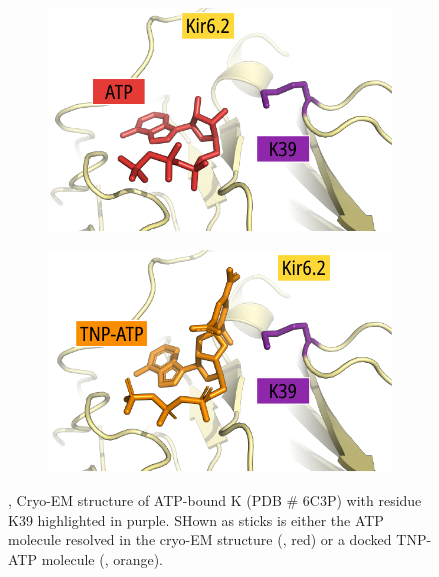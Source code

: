 \begin{figure}[h]
	\centering
	\begin{subfigure}[t]{0.45\textwidth}
		\caption{}\label{ch5fig:k39_clash_atp}
		\centering
		\includegraphics[width=\textwidth]{k39_clash_atp.pdf}
	\end{subfigure}
	\hfill
	\begin{subfigure}[t]{0.45\textwidth}
		\caption{}\label{ch5fig:k39_clash_tnpatp}
		\centering
		\includegraphics[width=\textwidth]{k39_clash_tnpatp.pdf}
	\end{subfigure}
	\caption[K39 is in close proximity to the TNP moiety of bound TNP-ATP]{
	,  Cryo-EM structure of ATP-bound K\ATP{} (PDB \# 6C3P) with residue K39 highlighted in purple.
	SHown as sticks is either the ATP molecule resolved in the cryo-EM structure (, red) or a docked TNP-ATP molecule (, orange).
	}\label{ch5fig:k39_3}
\end{figure}

